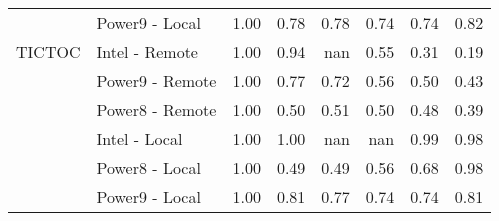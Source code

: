 \begin{tabular}{llrrrrrr}
       & Power9 - Local &   1.00 &   0.78 &   0.78 &   0.74 &   0.74 &   0.82 \\
TICTOC & Intel - Remote &   1.00 &   0.94 &    nan &   0.55 &   0.31 &   0.19 \\
       & Power9 - Remote &   1.00 &   0.77 &   0.72 &   0.56 &   0.50 &   0.43 \\
       & Power8 - Remote &   1.00 &   0.50 &   0.51 &   0.50 &   0.48 &   0.39 \\
       & Intel - Local &   1.00 &   1.00 &    nan &    nan &   0.99 &   0.98 \\
       & Power8 - Local &   1.00 &   0.49 &   0.49 &   0.56 &   0.68 &   0.98 \\
       & Power9 - Local &   1.00 &   0.81 &   0.77 &   0.74 &   0.74 &   0.81 \\
\bottomrule
\end{tabular}
